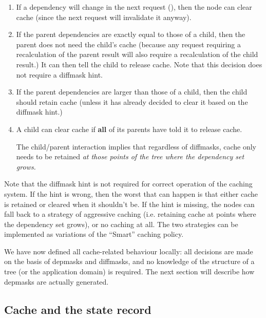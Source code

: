   \begin{enumerate}
  
  \item If a dependency will change in the next request (), then the node can clear cache (since the next request will
    invalidate it anyway).

  \item If the parent dependencies are exactly equal to those of a child, then
    the parent does not need the child's cache (because any request requiring a
    recalculation of the parent result will also require a recalculation of the
    child result.) It can then tell the child to release cache. Note that this
    decision does not require a diffmask hint.

  \item If the parent dependencies are larger than those of a child, then the 
    child should retain cache (unless it has already decided to clear it
    based on the diffmask hint.) 

  \item A child can clear cache if {\bf all} of its parents have told it to
    release cache.
    
    The child/parent interaction implies that regardless of diffmasks, cache
    only needs to be retained {\em at those points of the tree where the
    dependency set grows.}

  \end{enumerate}
  
  Note that the diffmask hint is not required for correct operation of the
  caching system. If the hint is wrong, then the worst that can happen is that
  either cache is retained or cleared when it shouldn't be. If the hint is
  missing, the nodes can fall back to a strategy of aggressive caching (i.e.
  retaining cache at points where the dependency set grows), or no caching at
  all. The two strategies can be implemented as variations of the ``Smart''
  caching policy.

  We have now defined all cache-related behaviour locally: all decisions are
  made on the basis of depmasks and diffmasks, and no knowledge of the
  structure of a tree (or the application domain) is required. The next section
  will describe how depmasks are actually generated.

\subsection{Cache and the state record}

